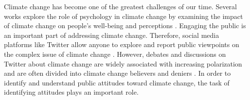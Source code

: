 \documentclass[letterpaper]{article}
\begin{document}
Climate change has become one of the greatest challenges of our time. %
Several works explore the role of psychology in climate change by examining the impact of climate change on people's well-being and perceptions \cite{clayton2020climate}. Engaging the public is an important part of addressing climate change. Therefore, social media platforms like Twitter allow anyone to explore and report public viewpoints on the complex issue of climate change \cite{lineman2015talking,dahal2019topic}. %
However, debates and discussions on Twitter about climate change are widely associated with increasing polarization and are often divided into climate change believers and deniers \cite{jang2015polarized}. In order to identify and understand public attitudes toward climate change, the task of identifying attitudes plays an important role.
\end{document}
